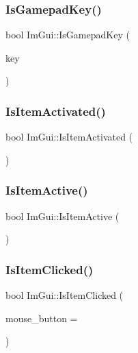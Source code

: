 \subsubsection{\texorpdfstring{Is\+Gamepad\+Key()}{IsGamepadKey()}}
{\footnotesize\ttfamily bool Im\+Gui\+::\+Is\+Gamepad\+Key (\begin{DoxyParamCaption}\item[{\hyperlink{imgui_8h_aa22ffe36b188427d712447ec465203d4}{Im\+Gui\+Key}}]{key }\end{DoxyParamCaption})\hspace{0.3cm}{\ttfamily [inline]}}

\mbox{\label{namespaceImGui_a574b7cecdeb707c429edc827c49983f5}} 
\subsubsection{\texorpdfstring{Is\+Item\+Activated()}{IsItemActivated()}}
{\footnotesize\ttfamily bool Im\+Gui\+::\+Is\+Item\+Activated (\begin{DoxyParamCaption}{ }\end{DoxyParamCaption})}

\mbox{\label{namespaceImGui_a2d8ac4569456a8003e4dddd39caf771c}} 
\subsubsection{\texorpdfstring{Is\+Item\+Active()}{IsItemActive()}}
{\footnotesize\ttfamily bool Im\+Gui\+::\+Is\+Item\+Active (\begin{DoxyParamCaption}{ }\end{DoxyParamCaption})}

\mbox{\label{namespaceImGui_a11ae401d73ed6b044ba46add5db54617}} 
\subsubsection{\texorpdfstring{Is\+Item\+Clicked()}{IsItemClicked()}}
{\footnotesize\ttfamily bool Im\+Gui\+::\+Is\+Item\+Clicked (\begin{DoxyParamCaption}\item[{Im\+Gui\+Mouse\+Button}]{mouse\+\_\+button = {} }\end{DoxyParamCaption})}

